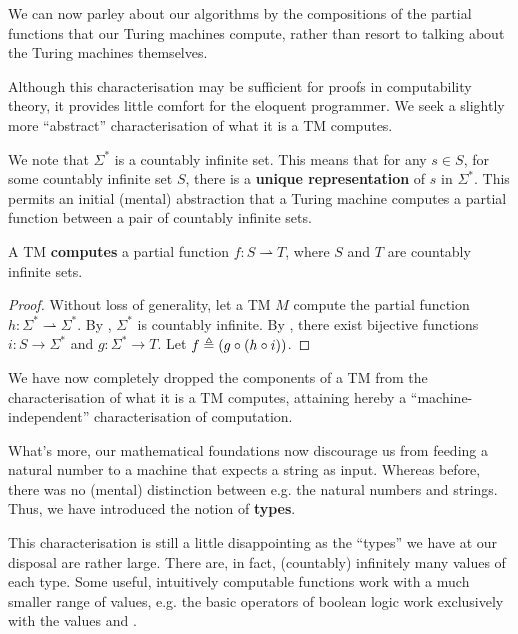 We can now parley about our algorithms by the compositions of the partial
functions that our Turing machines compute, rather than resort to talking about
the Turing machines themselves.

Although this characterisation may be sufficient for proofs in computability
theory, it provides little comfort for the eloquent programmer. We seek a
slightly more ``abstract'' characterisation of what it is a TM computes.

We note that $\Sigma^*$ is a countably infinite set. This means that for any $s
\in S$, for some countably infinite set $S$, there is a \textbf{unique
representation} of $s$ in $\Sigma^*$. This permits an initial (mental)
abstraction that a Turing machine computes a partial function between a pair of
countably infinite sets.

\begin{theorem} \label{thm:tm-countably-infinite} A TM \textbf{computes} a
partial function $f : S \rightharpoonup T$, where $S$ and $T$ are countably
infinite sets.  \end{theorem}

\begin{proof} Without loss of generality, let a TM $M$ compute the partial
function $h : \Sigma^* \rightharpoonup \Sigma^*$. By
, $\Sigma^*$ is countably infinite. By
, there exist bijective
functions $i : S \rightarrow \Sigma^*$ and $g : \Sigma^* \rightarrow T$.  Let
$f \triangleq \mathopen{}\left({g \circ \mathopen{}\left({h \circ i}\right)\mathclose{}}\right)\mathclose{}$.\end{proof}

\begin{remark} We have now completely dropped the components of a TM from the
characterisation of what it is a TM computes, attaining hereby a
``machine-independent'' characterisation of computation.
\end{remark}

What's more, our mathematical foundations now discourage us from feeding a
natural number to a machine that expects a string as input. Whereas before,
there was no (mental) distinction between e.g. the natural numbers and strings.
Thus, we have introduced the notion of \textbf{types}.

This characterisation is still a little disappointing as the ``types'' we have
at our disposal are rather large. There are, in fact, (countably) infinitely
many values of each type. Some useful, intuitively computable functions work
with a much smaller range of values, e.g. the basic operators of boolean logic
work exclusively with the values \strue{} and \sfalse{}.

